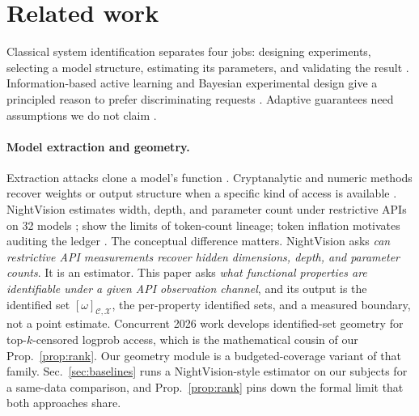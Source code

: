\section{Related work}
\label{sec:related}
Classical system identification separates four jobs: designing experiments, selecting a
model structure, estimating its parameters, and validating the result
\cite{ljung1999system}.  Information-based active learning and Bayesian experimental
design give a principled reason to prefer discriminating requests
\cite{mackay1992information,chaloner1995bayesian}.  Adaptive guarantees need assumptions
we do not claim \cite{golovin2011adaptive}.

\paragraph{Model extraction and geometry.}  Extraction attacks clone a model's function
\cite{tramer2016stealing,orekondy2019knockoff,krishna2020thieves,papernot2017practical}.
Cryptanalytic and numeric methods recover weights or output structure when a specific
kind of access is available
\cite{carlini2020cryptanalytic,rolnick2020reverse,carlini2024stealing,
finlayson2024logits,finlayson2024decoding}.  NightVision estimates width, depth, and
parameter count under restrictive APIs on 32 models \cite{ellis2026nightvision};
\cite{chen2026tokencounts} show the limits of token-count lineage; token inflation
motivates auditing the ledger \cite{chen2026tokeninflation}.  The conceptual difference
matters.  NightVision asks \emph{can restrictive API measurements recover hidden
dimensions, depth, and parameter counts}.  It is an estimator.  This paper asks
\emph{what functional properties are identifiable under a given API observation
channel}, and its output is the identified set $[\omega]_{\mathcal C,\mathcal X}$, the
per-property identified sets, and a measured boundary, not a point estimate.
Concurrent 2026 work develops identified-set geometry for top-$k$-censored logprob
access, which is the mathematical cousin of our Prop.~\ref{prop:rank}.  Our geometry
module is a budgeted-coverage variant of that family.  Sec.~\ref{sec:baselines} runs a
NightVision-style estimator on our subjects for a same-data comparison, and
Prop.~\ref{prop:rank} pins down the formal limit that both approaches share.

